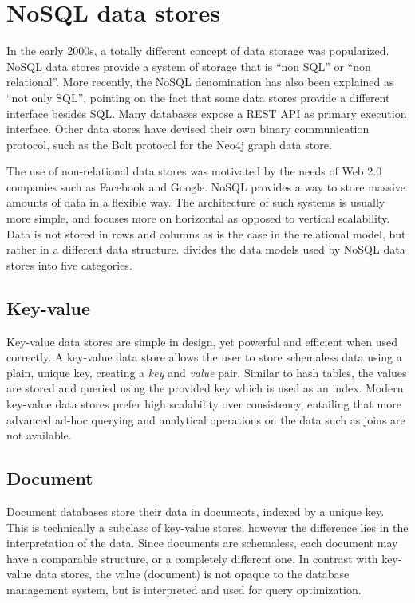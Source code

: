 \section{NoSQL data stores}
\label{sec:nosql-data-stores}

In the early 2000s, a totally different concept of data storage was popularized.
NoSQL data stores provide a system of storage that is ``non SQL'' or ``non relational''.
More recently, the NoSQL denomination has also been explained as ``not only SQL'', pointing on the fact that some data stores provide a different interface besides SQL.
Many databases expose a REST API as primary execution interface.
Other data stores have devised their own binary communication protocol, such as the Bolt protocol \autocite{Bolt2015} for the Neo4j graph data store.


The use of non-relational data stores was motivated by the needs of Web 2.0 companies such as Facebook and Google.
NoSQL provides a way to store massive amounts of data in a flexible way.
The architecture of such systems is usually more simple, and focuses more on horizontal as opposed to vertical scalability.
Data is not stored in rows and columns as is the case in the relational model, but rather in a different data structure.
\textcite{Nayak2013} divides the data models used by NoSQL data stores into five categories.

\subsection{Key-value}
\label{subsec:key-value}

Key-value data stores are simple in design, yet powerful and efficient when used correctly.
A key-value data store allows the user to store schemaless data using a plain, unique key, creating a \textit{key} and \textit{value} pair.
Similar to hash tables, the values are stored and queried using the provided key which is used as an index.
Modern key-value data stores prefer high scalability over consistency, entailing that more advanced ad-hoc querying and analytical operations on the data such as joins are not available.

\subsection{Document}
\label{subsec:document}

Document databases store their data in documents, indexed by a unique key.
This is technically a subclass of key-value stores, however the difference lies in the interpretation of the data.
Since documents are schemaless, each document may have a comparable structure, or a completely different one.
In contrast with key-value data stores, the value (document) is not opaque to the database management system, but is interpreted and used for query optimization.

